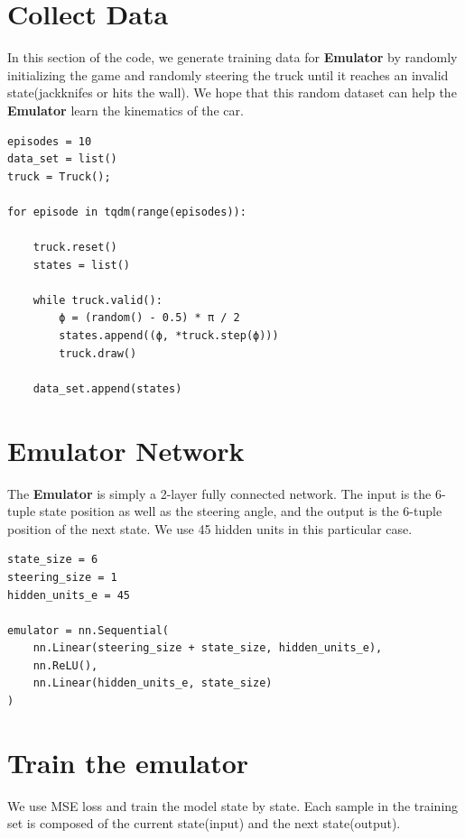 \section{Collect Data}
In this section of the code, we generate training data for \textbf{Emulator} by randomly initializing the game and randomly steering the truck until it reaches an invalid state(jackknifes or hits the wall). We hope that this random dataset can help the \textbf{Emulator} learn the kinematics of the car.

\begin{verbatim}
episodes = 10
data_set = list()
truck = Truck();

for episode in tqdm(range(episodes)):
    
    truck.reset()
    states = list()
    
    while truck.valid():
        ϕ = (random() - 0.5) * π / 2
        states.append((ϕ, *truck.step(ϕ)))
        truck.draw()
    
    data_set.append(states)
\end{verbatim}

\section{Emulator Network}
The \textbf{Emulator} is simply a 2-layer fully connected network. The input is the 6-tuple state position as well as the steering angle, and the output is the 6-tuple position of the next state. We use 45 hidden units in this particular case.

\begin{verbatim}
state_size = 6
steering_size = 1
hidden_units_e = 45

emulator = nn.Sequential(
    nn.Linear(steering_size + state_size, hidden_units_e),
    nn.ReLU(),
    nn.Linear(hidden_units_e, state_size)
)
\end{verbatim}

\section{Train the emulator}

We use MSE loss and train the model state by state. Each sample in the training set is composed of the current state(input) and the next state(output).

